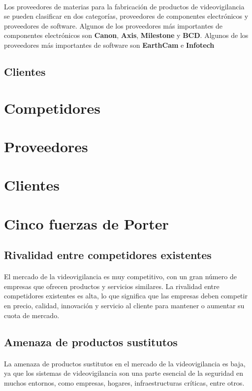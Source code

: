 \documentclass{report}
\begin{document}
          \paragraph*{}
          {
            Los proveedores de materias para la fabricación de productos de videovigilancia se pueden clasificar en dos categorías, proveedores de componentes electrónicos y proveedores de software. 
            Algunos de los proveedores más importantes de componentes electrónicos son \textbf{Canon}, \textbf{Axis}, \textbf{Milestone} y \textbf{BCD}. 
            Algunos de los proveedores más importantes de software son \textbf{EarthCam} e \textbf{Infotech}
          }
        \subsection{Clientes}
      \section{Competidores}
      \section{Proveedores}
      \section{Clientes}
      \section{Cinco fuerzas de Porter}
        \subsection*{Rivalidad entre competidores existentes}
          \paragraph*{}{El mercado de la videovigilancia es muy competitivo, con un gran número de empresas que ofrecen productos y servicios similares. La rivalidad entre competidores existentes es alta, lo que significa que las empresas deben competir en precio, calidad, innovación y servicio al cliente para mantener o aumentar su cuota de mercado.}
        \subsection*{Amenaza de productos sustitutos}
          \paragraph*{}{La amenaza de productos sustitutos en el mercado de la videovigilancia es baja, ya que los sistemas de videovigilancia son una parte esencial de la seguridad en muchos entornos, como empresas, hogares, infraestructuras críticas, entre otros.}
\end{document}
